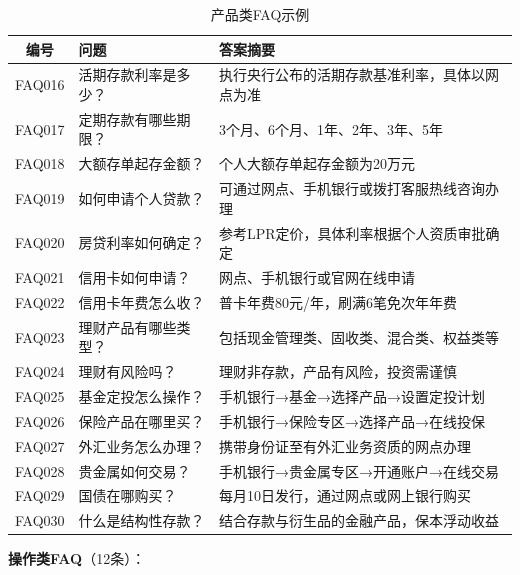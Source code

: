 \begin{table}[H]
\centering
\small
\begin{tabular}{clp{7cm}}
\toprule
\textbf{编号} & \textbf{问题} & \textbf{答案摘要} \\
\midrule
FAQ016 & 活期存款利率是多少？ & 执行央行公布的活期存款基准利率，具体以网点为准 \\
FAQ017 & 定期存款有哪些期限？ & 3个月、6个月、1年、2年、3年、5年 \\
FAQ018 & 大额存单起存金额？ & 个人大额存单起存金额为20万元 \\
FAQ019 & 如何申请个人贷款？ & 可通过网点、手机银行或拨打客服热线咨询办理 \\
FAQ020 & 房贷利率如何确定？ & 参考LPR定价，具体利率根据个人资质审批确定 \\
FAQ021 & 信用卡如何申请？ & 网点、手机银行或官网在线申请 \\
FAQ022 & 信用卡年费怎么收？ & 普卡年费80元/年，刷满6笔免次年年费 \\
FAQ023 & 理财产品有哪些类型？ & 包括现金管理类、固收类、混合类、权益类等 \\
FAQ024 & 理财有风险吗？ & 理财非存款，产品有风险，投资需谨慎 \\
FAQ025 & 基金定投怎么操作？ & 手机银行→基金→选择产品→设置定投计划 \\
FAQ026 & 保险产品在哪里买？ & 手机银行→保险专区→选择产品→在线投保 \\
FAQ027 & 外汇业务怎么办理？ & 携带身份证至有外汇业务资质的网点办理 \\
FAQ028 & 贵金属如何交易？ & 手机银行→贵金属专区→开通账户→在线交易 \\
FAQ029 & 国债在哪购买？ & 每月10日发行，通过网点或网上银行购买 \\
FAQ030 & 什么是结构性存款？ & 结合存款与衍生品的金融产品，保本浮动收益 \\
\bottomrule
\end{tabular}
\caption{产品类FAQ示例}
\end{table}

\textbf{操作类FAQ}（12条）：

